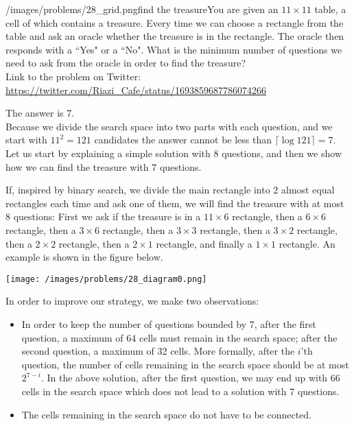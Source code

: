 \begin{problem}{/images/problems/28_grid.png}{find the treasure}You are given an $11 \times 11$ table, a cell of which contains a treasure. Every time we can choose a  rectangle from the table and ask an oracle whether the treasure is in the rectangle. The oracle then responds with a ``Yes" or a ``No". What is the minimum number of questions we need to ask from the oracle in order to find the treasure?\\[0.2cm]

Link to the problem on Twitter:  \url{https://twitter.com/Riazi_Cafe/status/1693859687786074266}\end{problem}
\begin{solution}
The answer is 7.\\[0.2cm]

Because we divide the search space into two parts with each question, and we start with $11^2 = 121$ candidates the answer cannot be less than $\lceil \log 121\rceil=7$. Let us start by explaining a simple solution with 8 questions, and then we show how we can find the treasure with 7 questions.

If, inspired by binary search, we divide the main rectangle into 2 almost equal rectangles each time and ask one of them, we will find the treasure with at most 8 questions: First we ask if the treasure is in a  $11\times 6$ rectangle, then a $6\times 6$ rectangle, then a $3 \times 6$ rectangle, then a $3 \times 3$ rectangle, then a $3 \times 2$ rectangle, then a $2 \times 2$ rectangle, then a $2 \times 1$ rectangle, and finally a $1 \times 1$ rectangle. An example is shown in the figure below.

\begin{center}
	\texttt{[image: /images/problems/28\_diagram0.png]}
\end{center}

In order to improve our strategy, we make two observations:
\begin{itemize}
\item In order to keep the number of questions bounded by 7, after the first question, a maximum of 64 cells must remain in the search space; after the second question, a maximum of 32 cells. More formally, after the $i$'th question, the number of cells remaining in the search space should be at most $2^{7-i}$. In the above solution, after the first question, we may end up with 66 cells in the search space which does not lead to a solution with 7 questions.
\item The cells remaining in the search space do not have to be connected.
\end{itemize}


\end{solution}
